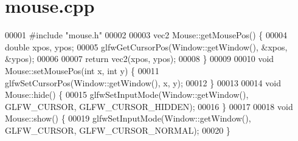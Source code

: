 \section{mouse.\+cpp}
\label{mouse_8cpp_source}

\begin{DoxyCode}
00001 \textcolor{preprocessor}{#include "mouse.h"}
00002 
00003 vec2 Mouse::getMousePos() \{
00004     \textcolor{keywordtype}{double} xpos, ypos;
00005     glfwGetCursorPos(Window::getWindow(), &xpos, &ypos);
00006 
00007     \textcolor{keywordflow}{return} vec2(xpos, ypos);
00008 \}
00009 
00010 \textcolor{keywordtype}{void} Mouse::setMousePos(\textcolor{keywordtype}{int} x, \textcolor{keywordtype}{int} y) \{
00011     glfwSetCursorPos(Window::getWindow(), x, y);
00012 \}
00013 
00014 \textcolor{keywordtype}{void} Mouse::hide() \{
00015     glfwSetInputMode(Window::getWindow(), GLFW\_CURSOR, GLFW\_CURSOR\_HIDDEN);
00016 \}
00017 
00018 \textcolor{keywordtype}{void} Mouse::show() \{
00019     glfwSetInputMode(Window::getWindow(), GLFW\_CURSOR, GLFW\_CURSOR\_NORMAL);
00020 \}
\end{DoxyCode}

